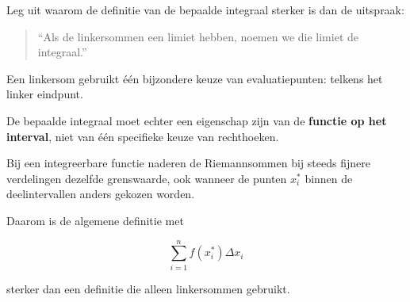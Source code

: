 \documentclass{ximera}
\begin{document}
\begin{oefening}{\oefG}

Leg uit waarom de definitie van de bepaalde integraal sterker is dan de
uitspraak:

\begin{quote}
``Als de linkersommen een limiet hebben, noemen we die limiet de
integraal.''
\end{quote}

\begin{oplossing}
Een linkersom gebruikt één bijzondere keuze van evaluatiepunten:
telkens het linker eindpunt.

De bepaalde integraal moet echter een eigenschap zijn van de
\textbf{functie op het interval}, niet van één specifieke keuze van
rechthoeken.

Bij een integreerbare functie naderen de Riemannsommen bij steeds
fijnere verdelingen dezelfde grenswaarde, ook wanneer de punten
\(x_i^\ast\) binnen de deelintervallen anders gekozen worden.

Daarom is de algemene definitie met

\[
\sum_{i=1}^n f(x_i^\ast)\Delta x_i
\]

sterker dan een definitie die alleen linkersommen gebruikt.
\end{oplossing}

\end{oefening}


\end{document}
